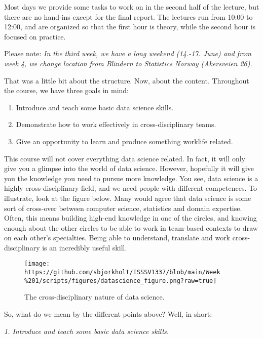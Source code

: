 \documentclass[
]{article}
\providecommand{\tightlist}{%
  \setlength{\itemsep}{0pt}\setlength{\parskip}{0pt}}
\begin{document}
Most days we provide some tasks to work on in the second half of the
lecture, but there are no hand-ins except for the final report. The
lectures run from 10:00 to 12:00, and are organized so that the first
hour is theory, while the second hour is focused on practice.

Please note: \emph{In the third week, we have a long weekend (14.-17.
June) and from week 4, we change location from Blindern to Statistics
Norway (Akersveien 26).}

\hfill\break

That was a little bit about the structure. Now, about the content.
Throughout the course, we have three goals in mind:

\begin{enumerate}
\def\labelenumi{\arabic{enumi}.}
\tightlist
\item
  Introduce and teach some basic data science skills.
\item
  Demonstrate how to work effectively in cross-disciplinary teams.
\item
  Give an opportunity to learn and produce something worklife related.
\end{enumerate}

This course will not cover everything data science related. In fact, it
will only give you a glimpse into the world of data science. However,
hopefully it will give you the knowledge you need to pursue more
knowledge. You see, data science is a highly cross-disciplinary field,
and we need people with different competences. To illustrate, look at
the figure below. Many would agree that data science is some sort of
cross-over between computer science, statistics and domain expertise.
Often, this means building high-end knowledge in one of the circles, and
knowing enough about the other circles to be able to work in team-based
contexts to draw on each other's specialties. Being able to understand,
translate and work cross-disciplinary is an incredibly useful skill.

\begin{figure}
\centering
\texttt{[image: https://github.com/sbjorkholt/ISSSV1337/blob/main/Week\\\%201/scripts/figures/datascience\_figure.png?raw=true]}
\caption{The cross-disciplinary nature of data science.}
\end{figure}

So, what do we mean by the different points above? Well, in short:

\emph{1. Introduce and teach some basic data science skills.}
\end{document}

